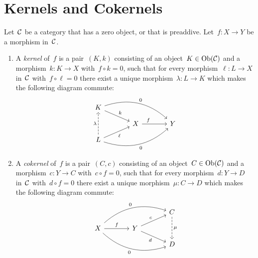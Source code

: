\section{Kernels and Cokernels}


\begin{definition}
  Let~$\mathcal{C}$ be a category that has a zero object, or that is preaddive.
  Let~$f \colon X \to Y$ be a morphism in~$\mathcal{C}$.
  \begin{enumerate}
      \item
        A \emph{kernel} of~$f$ is a pair~$(K,k)$ consisting of an object~$K \in \operatorname{Ob}(\mathcal{C})$ and a morphism~$k \colon K \to X$ with~$f \circ k = 0$, such that for every morphism~$\ell \colon L \to X$ in~$\mathcal{C}$ with~$f \circ \ell = 0$ there exist a unique morphism~$\lambda \colon L \to K$ which makes the following diagram commute:
        \[
          \begin{tikzcd}[row sep = small, column sep = large]
              K
              \arrow{dr}[above right]{k}
              \arrow[bend left]{drr}[above right]{0}
            & {}
            & {}
            \\
              {}
            & X
              \arrow{r}[above, near start]{f}
            & Y
            \\
              L
              \arrow{ur}[below right]{\ell}
              \arrow[bend right]{urr}[below right]{0}
              \arrow[dashed]{uu}[left]{\lambda}
            & {}
            & {}
          \end{tikzcd}
        \]
      \item
        A \emph{cokernel} of~$f$ is a pair~$(C,c)$ consisting of an object~$C \in \operatorname{Ob}(\mathcal{C})$ and a morphism~$c \colon Y \to C$ with~$c \circ f = 0$, such that for every morphism~$d \colon Y \to D$ in~$\mathcal{C}$ with~$d \circ f = 0$ there exist a unique morphism~$\mu \colon C \to D$ which makes the following diagram commute:
        \[
          \begin{tikzcd}[row sep = small, column sep = large]
              {}
            & {}
            & C
              \arrow[dashed]{dd}[right]{\mu}
            \\
              X
              \arrow{r}[above]{f}
              \arrow[bend left]{urr}[above left]{0}
              \arrow[bend right]{drr}[below left]{0}
            & Y
              \arrow{ur}[above left]{c}
              \arrow{dr}[below left]{d}
            & {}
            \\
              {}
            & {}
            & D
          \end{tikzcd}
        \]
  \end{enumerate}
\end{definition}


